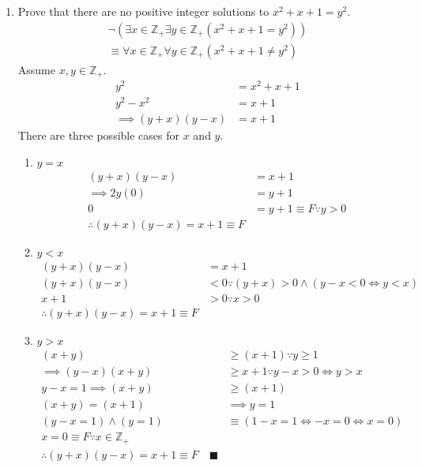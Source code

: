 \documentclass[letterpaper, 12pt]{article}
\newcommand{\qed}{\quad \blacksquare}
\newcommand{\integers}{\mathbb{Z}}
\begin{document}
\begin{enumerate}
\item Prove that there are no positive integer solutions to $x^2 + x + 1 = y^2$.
\begin{gather*}
    \neg(\exists x \in \mathbb{Z}_+ \exists y \in \mathbb{Z}_+(x^2 + x + 1 = y^2)) \\
    \equiv \forall x \in \mathbb{Z}_+ \forall y \in \mathbb{Z}_+(x^2 + x + 1 \ne y^2)
\end{gather*}
Assume $x, y \in \mathbb{Z}_+$.
\begin{align*}
    y^2 &= x^2 + x + 1 \\
    y^2 - x^2 &= x + 1 \\
    \implies (y + x)(y - x) &= x + 1
\end{align*}
There are three possible cases for $x$ and $y$.
\begin{enumerate}
    \item $y = x$
    \begin{align*}
        (y + x)(y - x) &= x + 1 \\
        \implies 2y(0) &= y + 1 \\
        0 &= y + 1 \equiv F \because y > 0 \\
        \therefore (y + x)(y - x) = x + 1 \equiv F
    \end{align*}
    \item $y < x$
    \begin{align*}
        (y + x)(y - x) &= x + 1 \\
        (y + x)(y - x) &< 0 \because (y + x) > 0 \wedge (y - x < 0 \iff y < x) \\
        x + 1 &> 0 \because x > 0 \\
        \therefore (y + x)(y - x) = x + 1 \equiv F
    \end{align*}
    \item $y > x$
    \begin{align*}
        (x + y) &\ge (x + 1) \because y \ge 1 \\
        \implies (y - x)(x + y) &\ge x + 1 \because y - x > 0 \iff y > x \\
        y - x = 1 \implies (x + y) &\ge (x + 1) \\
        (x + y) = (x + 1) &\implies y = 1 \\
        (y - x = 1) \wedge (y = 1) &\equiv (1 - x = 1 \iff - x = 0 \iff x = 0) \\
        x = 0 \equiv F \because x \in \integers_+ \\
        \therefore (y + x)(y - x) = x + 1 \equiv F \qed
    \end{align*}

\end{enumerate}
\end{enumerate}
\end{document}
